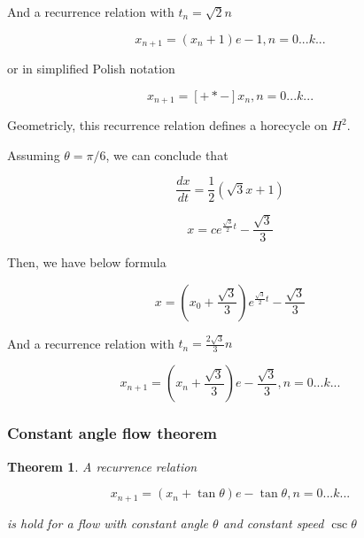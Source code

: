\documentclass{article}
\newtheorem{theorem}{Theorem}
\begin{document}
And a recurrence relation with $t_n = \sqrt{2} n$

\begin{equation}
    x_{n+1} = (x_n + 1) e - 1, n = 0 ... k ...
\end{equation}

or in simplified Polish notation

\begin{equation}
    x_{n+1} = [+*-] x_n, n = 0 ... k ...
\end{equation}

Geometricly, this recurrence relation defines a horecycle on $H^2$.

Assuming $\theta = \pi / 6$, we can conclude that

\begin{equation}
    \frac{dx}{dt} = \frac{1}{2} (\sqrt{3} x + 1)
\end{equation}

\begin{equation}
    x = c e^{\frac{\sqrt{3}}{2}t} - \frac{\sqrt{3}}{3}
\end{equation}

Then, we have below formula

\begin{equation}
    x = (x_0 + \frac{\sqrt{3}}{3})e^{\frac{\sqrt{3}}{2}t} - \frac{\sqrt{3}}{3}
\end{equation}

And a recurrence relation with $t_n = \frac{2\sqrt{3}}{3} n$

\begin{equation}
    x_{n+1} = (x_n + \frac{\sqrt{3}}{3}) e - \frac{\sqrt{3}}{3}, n = 0 ... k ...
\end{equation}

\subsubsection{Constant angle flow theorem}

\begin{theorem}
\label{l1}
A recurrence relation

\begin{equation}
    x_{n+1} = (x_n + \tan \theta) e - \tan \theta, n = 0 ... k ...
\end{equation}

is hold for a flow with constant angle $\theta$ and constant speed $\csc \theta$

\end{theorem}
\end{document}

